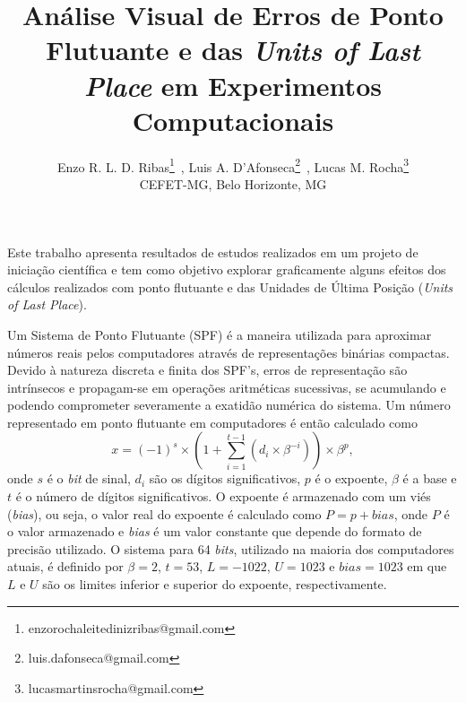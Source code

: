 \documentclass{pssbmac}
\begin{document}

\title{Análise Visual de Erros de Ponto Flutuante e das \textit{Units of Last Place} em Experimentos Computacionais}

\author{
{\large Enzo R. L. D. Ribas}\thanks{enzorochaleitedinizribas@gmail.com}\, ,
{\large Luis A. D'Afonseca}\thanks{luis.dafonseca@gmail.com}\, ,
{\large Lucas M. Rocha}\thanks{lucasmartinsrocha@gmail.com}  \\
{\small CEFET-MG, Belo Horizonte, MG} \\
}
\criartitulo

Este trabalho apresenta resultados de estudos realizados em um projeto de
iniciação científica e tem como objetivo explorar graficamente alguns efeitos
dos cálculos realizados com ponto flutuante e das Unidades de Última Posição
(\textit{Units of Last Place}).

Um Sistema de Ponto Flutuante (SPF) é a maneira utilizada para aproximar
números reais pelos computadores através de representações binárias compactas.
Devido à natureza discreta e finita dos SPF's, erros de representação são
intrínsecos e propagam-se em operações aritméticas sucessivas, se acumulando e
podendo comprometer severamente a exatidão numérica do sistema. Um número
representado em ponto flutuante em computadores é então calculado como
\begin{equation}
    x =
    \left(-1\right)^s
    \times
    \left(1 + \sum_{i=1}^{t-1}
    \left(d_i \times \beta^{-i}\right)
    \right)
    \times
    \beta^p,
    \label{eq:spf}
\end{equation}
onde $s$ é o \textit{bit} de sinal, $d_i$ são os dígitos significativos, $p$ é o expoente, $\beta$ é a base e $t$ é o número de dígitos significativos. O expoente é armazenado com um viés (\textit{bias}), ou seja, o valor real do expoente é calculado como $P = p + \textit{bias} $, onde $P$ é o valor armazenado e \textit{bias} é um valor constante que depende do formato de precisão utilizado. O sistema para 64 \textit{bits}, utilizado na maioria dos computadores atuais, é definido por $\beta = 2$, $t = 53$, $L = -1022$, $U = 1023$ e $\textit{bias} = 1023$ em que $L$ e $U$ são os limites inferior e superior do expoente, respectivamente.
\end{document}
